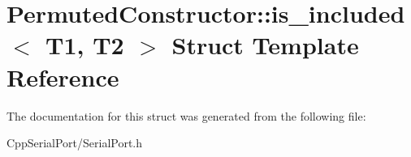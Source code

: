 \hypertarget{struct_permuted_constructor_1_1is__included}{}\section{Permuted\+Constructor\+:\+:is\+\_\+included$<$ T1, T2 $>$ Struct Template Reference}
\label{struct_permuted_constructor_1_1is__included}


The documentation for this struct was generated from the following file\+:\begin{DoxyCompactItemize}
\item 
Cpp\+Serial\+Port/Serial\+Port.\+h\end{DoxyCompactItemize}
